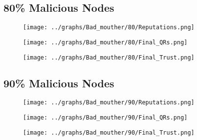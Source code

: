 \documentclass{article}
\begin{document}
  \begin{minipage}[t]{0.49\columnwidth}
    \subsection*{80\% Malicious Nodes}
        \begin{figure}[H]
            \centering
            \texttt{[image: ../graphs/Bad\_mouther/80/Reputations.png]}
        \end{figure}
        \begin{figure}[H]
            \centering
            \texttt{[image: ../graphs/Bad\_mouther/80/Final\_QRs.png]}
        \end{figure}
    \end{minipage}
    \begin{minipage}[t]{0.49\columnwidth}
        \begin{figure}[H]
            \centering
            \texttt{[image: ../graphs/Bad\_mouther/80/Final\_Trust.png]}
        \end{figure}
    \end{minipage}

    \begin{minipage}[t]{0.49\columnwidth}
    \subsection*{90\% Malicious Nodes}
        \begin{figure}[H]
            \centering
            \texttt{[image: ../graphs/Bad\_mouther/90/Reputations.png]}
        \end{figure}
        \begin{figure}[H]
            \centering
            \texttt{[image: ../graphs/Bad\_mouther/90/Final\_QRs.png]}
        \end{figure}
    \end{minipage}
    \begin{minipage}[t]{0.49\columnwidth}
        \begin{figure}[H]
            \centering
            \texttt{[image: ../graphs/Bad\_mouther/90/Final\_Trust.png]}
        \end{figure}
    \end{minipage}
    \newpage
\end{document}
